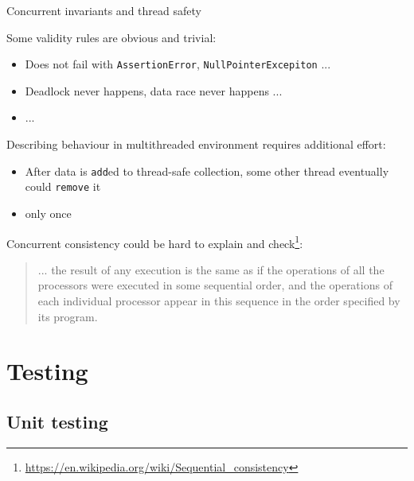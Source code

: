 \begin{frame}{Concurrent invariants and thread safety}

Some validity rules are obvious and trivial:
\begin{itemize}
  \item Does not fail with \texttt{AssertionError}, \texttt{NullPointerExcepiton} ...
  \item Deadlock never happens, data race never happens ...
  \item ...
\end{itemize}

\pause

Describing behaviour in multithreaded environment requires additional effort:
\begin{itemize}
  \item After data is \texttt{add}ed to thread-safe collection, some other thread eventually could \texttt{remove} it
  \pause
  \item only once
\end{itemize}

\pause

Concurrent consistency could be hard to explain and check\footnote<4->{\tiny\url{https://en.wikipedia.org/wiki/Sequential_consistency}}:
\begin{quote}
  ... the result of any execution is the same as if the operations of all the processors were executed in some sequential order, and the operations of each individual processor appear in this sequence in the order specified by its program.
\end{quote}

\pause

\alarmOne

\end{frame}


\section{Testing}
\showTOC

\subsection{Unit testing}

